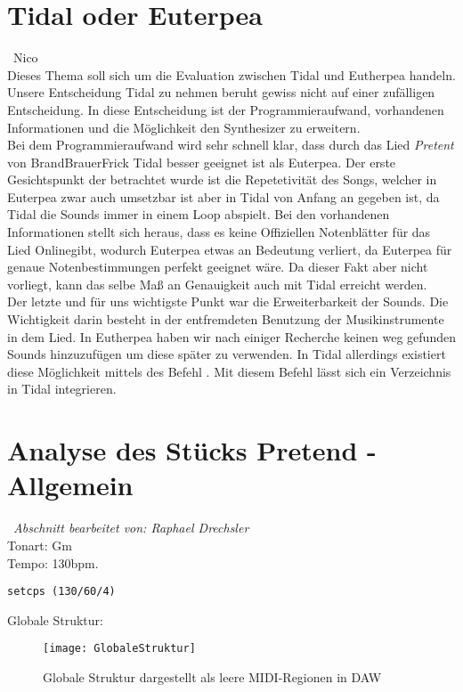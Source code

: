 \documentclass[
10pt, %
a4paper, %
oneside, %
headinclude,footinclude, %
BCOR5mm, %
]{scrartcl}
\begin{document}
\section{Tidal oder Euterpea}\
Nico\\
Dieses Thema soll sich um die Evaluation zwischen Tidal und Eutherpea handeln.\\
Unsere Entscheidung Tidal zu nehmen beruht gewiss nicht auf einer zufälligen Entscheidung. In diese Entscheidung ist der Programmieraufwand, vorhandenen Informationen
und die Möglichkeit den Synthesizer zu erweitern.\\
Bei dem Programmieraufwand wird sehr schnell klar, dass durch das Lied \textit{Pretent} von BrandBrauerFrick Tidal besser geeignet ist als Euterpea. Der erste Gesichtspunkt
der betrachtet wurde ist die Repetetivität des Songs, welcher in Euterpea zwar auch umsetzbar ist aber in Tidal von Anfang an gegeben ist, da Tidal die Sounds immer in einem
Loop abspielt. Bei den vorhandenen Informationen stellt sich heraus, dass es keine Offiziellen Notenblätter für das Lied Onlinegibt, wodurch Euterpea etwas an Bedeutung verliert, da Euterpea für genaue Notenbestimmungen perfekt geeignet wäre. Da dieser Fakt aber nicht vorliegt, kann das selbe Maß an Genauigkeit auch mit Tidal erreicht werden.\\
Der letzte und für uns wichtigste Punkt war die Erweiterbarkeit der Sounds. Die Wichtigkeit darin besteht in der entfremdeten Benutzung der Musikinstrumente in dem Lied.
In Eutherpea haben wir nach einiger Recherche keinen weg gefunden Sounds hinzuzufügen um diese später zu verwenden. In Tidal allerdings existiert diese Möglichkeit mittels
des Befehl \textit{}. Mit diesem Befehl lässt sich ein Verzeichnis in Tidal integrieren.
\section{Analyse des Stücks Pretend - Allgemein}\
\textit{Abschnitt bearbeitet von: Raphael Drechsler}\\

\noindent Tonart: Gm\\

\noindent Tempo: 130bpm.
\begin{lstlisting}
setcps (130/60/4)
\end{lstlisting}

\noindent Globale Struktur:
\begin{figure}[h]
	\centering 
	\texttt{[image: GlobaleStruktur]} 
	\caption{Globale Struktur dargestellt als leere MIDI-Regionen in DAW}
\end{figure}
\end{document}
